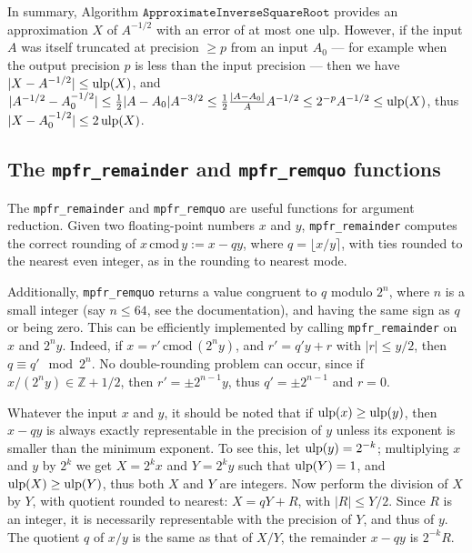 \documentclass[12pt]{amsart}
\def\ulp{{\rm ulp}}
\def\cmod{\,\mathrm{cmod}\,}
\begin{document}
\medskip

In summary, Algorithm $\texttt{ApproximateInverseSquareRoot}$ provides an
approximation $X$ of $A^{-1/2}$ with an error of at most one ulp.
However, if the input $A$ was itself truncated at precision $\geq p$
from an input $A_0$ ---
for example when the output precision $p$ is less than the input precision ---
then we have $|X - A^{-1/2}| \leq \ulp(X)$, and
$|A^{-1/2} - A_0^{-1/2}| \leq \frac{1}{2} |A - A_0| A^{-3/2}
\leq \frac{1}{2} \frac{|A - A_0|}{A} A^{-1/2}
\leq 2^{-p} A^{-1/2} \leq \ulp(X)$, thus
$|X - A_0^{-1/2}| \leq 2 \, \ulp(X)$.

\subsection{The \texttt{mpfr\_remainder} and \texttt{mpfr\_remquo} functions}

The \texttt{mpfr\_remainder} and \texttt{mpfr\_remquo} are useful
functions for argument reduction. Given two floating-point numbers $x$ and
$y$, \texttt{mpfr\_remainder} computes the correct rounding of
$x \cmod y := x - q y$, where
$q = \lfloor x/y \rceil$, with ties rounded to the nearest even integer,
as in the rounding to nearest mode.

Additionally, \texttt{mpfr\_remquo} returns a value congruent to $q$
modulo $2^n$, where $n$ is a small integer (say $n \leq 64$, see the
documentation), and having the same sign as $q$ or being zero.
This can be efficiently implemented by calling \texttt{mpfr\_remainder} on
$x$ and $2^n y$. Indeed, if $x = r' \cmod (2^n y)$, and
$r' = q' y + r$ with $|r| \leq y/2$, then
$q \equiv q' \mod 2^n$. No double-rounding problem can occur, since if
$x/(2^n y) \in {\mathbb Z} + 1/2$,
then $r'=\pm 2^{n-1} y$, thus $q'=\pm 2^{n-1}$ and $r=0$.

Whatever the input $x$ and $y$, it should be noted that if $\ulp(x) \geq
\ulp(y)$, then $x - q y$ is always
exactly representable in the precision of $y$ unless its exponent is smaller
than the minimum exponent. To see this,
let $\ulp(y) = 2^{-k}$;
multiplying $x$ and $y$ by $2^k$ we get $X = 2^k x$ and
$Y = 2^k y$ such that $\ulp(Y)=1$,
and $\ulp(X) \geq \ulp(Y)$, thus both $X$ and $Y$ are integers.
Now perform the division of $X$ by $Y$, with quotient rounded to nearest:
$X = q Y + R$, with $|R| \leq Y/2$. Since $R$ is an integer, it is
necessarily representable with the precision of $Y$, and thus of $y$.
The quotient $q$ of $x/y$ is the same as that of $X/Y$, the remainder
$x - q y$ is $2^{-k} R$.
\end{document}
